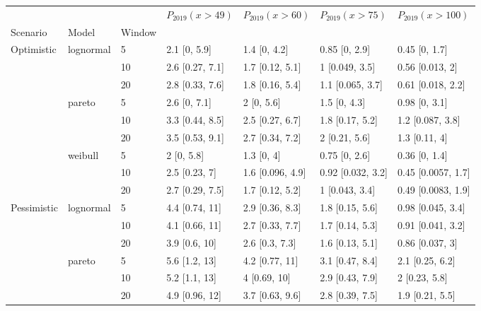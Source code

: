 \begin{tabular}{lllllll}
\toprule
           &         &    & $P_{2019}(x>49)$ &  $P_{2019}(x>60)$ &   $P_{2019}(x>75)$ &   $P_{2019}(x>100)$ \\
Scenario & Model & Window &                  &                   &                    &                     \\
\midrule
Optimistic & lognormal & 5  &     2.1 [0, 5.9] &      1.4 [0, 4.2] &      0.85 [0, 2.9] &       0.45 [0, 1.7] \\
           &         & 10 &  2.6 [0.27, 7.1] &   1.7 [0.12, 5.1] &     1 [0.049, 3.5] &     0.56 [0.013, 2] \\
           &         & 20 &  2.8 [0.33, 7.6] &   1.8 [0.16, 5.4] &   1.1 [0.065, 3.7] &   0.61 [0.018, 2.2] \\
           & pareto & 5  &     2.6 [0, 7.1] &        2 [0, 5.6] &       1.5 [0, 4.3] &       0.98 [0, 3.1] \\
           &         & 10 &  3.3 [0.44, 8.5] &   2.5 [0.27, 6.7] &    1.8 [0.17, 5.2] &    1.2 [0.087, 3.8] \\
           &         & 20 &  3.5 [0.53, 9.1] &   2.7 [0.34, 7.2] &      2 [0.21, 5.6] &       1.3 [0.11, 4] \\
           & weibull & 5  &       2 [0, 5.8] &        1.3 [0, 4] &      0.75 [0, 2.6] &       0.36 [0, 1.4] \\
           &         & 10 &    2.5 [0.23, 7] &  1.6 [0.096, 4.9] &  0.92 [0.032, 3.2] &  0.45 [0.0057, 1.7] \\
           &         & 20 &  2.7 [0.29, 7.5] &   1.7 [0.12, 5.2] &     1 [0.043, 3.4] &  0.49 [0.0083, 1.9] \\
Pessimistic & lognormal & 5  &   4.4 [0.74, 11] &   2.9 [0.36, 8.3] &    1.8 [0.15, 5.6] &   0.98 [0.045, 3.4] \\
           &         & 10 &   4.1 [0.66, 11] &   2.7 [0.33, 7.7] &    1.7 [0.14, 5.3] &   0.91 [0.041, 3.2] \\
           &         & 20 &    3.9 [0.6, 10] &    2.6 [0.3, 7.3] &    1.6 [0.13, 5.1] &     0.86 [0.037, 3] \\
           & pareto & 5  &    5.6 [1.2, 13] &    4.2 [0.77, 11] &    3.1 [0.47, 8.4] &     2.1 [0.25, 6.2] \\
           &         & 10 &    5.2 [1.1, 13] &      4 [0.69, 10] &    2.9 [0.43, 7.9] &       2 [0.23, 5.8] \\
           &         & 20 &   4.9 [0.96, 12] &   3.7 [0.63, 9.6] &    2.8 [0.39, 7.5] &     1.9 [0.21, 5.5] \\

\end{tabular}
